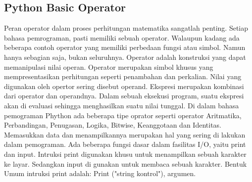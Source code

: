 \subsection{Python Basic Operator}
Peran operator dalam proses perhitungan matematika sangatlah penting.
Setiap bahasa pemrograman, pasti memiliki sebuah operator. Walaupun kadang ada beberapa contoh operator yang memiliki perbedaan fungsi atau simbol. Namun hanya sebagian saja, bukan seluruhnya. Operator adalah konstruksi yang dapat memanipulasi nilai operan.
Operator merupakan simbol khusus yang mempresentasikan perhitungan seperti penambahan dan perkalian. Nilai yang digunakan oleh opertor sering disebut operand. Ekspresi merupakan kombinasi dari operator dan operandnya. Dalam sebuah eksekusi program, suatu ekspresi akan di evaluasi sehingga menghasilkan suatu nilai tunggal. Di dalam bahasa pemograman Phython ada beberapa tipe oprator seperti operator Aritmatika, Perbandingan, Penugasan, Logika, Bitwise, Keanggotaan dan Identitas. Memasukkan data dan menampilkannya merupakan hal yang sering di lakukan dalam pemograman. Ada beberapa fungsi dasar dalam fasilitas I/O, yaitu print dan input. Intruksi print digunakan khusu untuk menampilkan sebuah karakter ke layar. Sedangkan input di gunakan untuk membaca sebuah karakter. Bentuk Umum intruksi print adalah: Print ("string kontrol"), argumen.

